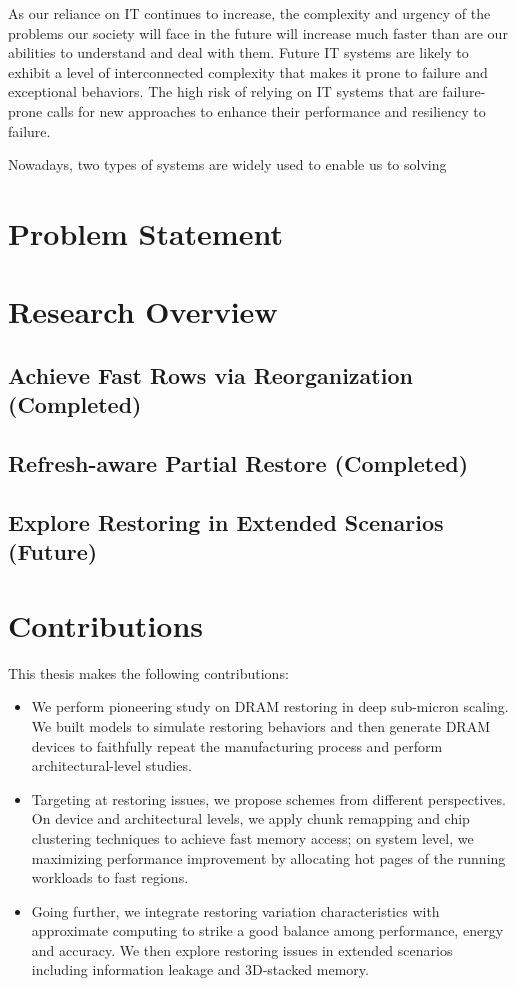 As our reliance on IT continues to increase, the complexity and urgency of the problems our society will face in the future will increase much faster than are our abilities to understand and deal with them. Future IT systems are likely to exhibit a level of interconnected complexity that makes it prone to failure and exceptional behaviors. The high risk of relying on IT systems that are failure-prone calls for new approaches to enhance their performance and resiliency to failure. 

Nowadays, two types of systems are widely used to enable us to solving 



\section{Problem Statement}

\section{Research Overview}

\subsection{Achieve Fast Rows via Reorganization (Completed)}

\subsection{Refresh-aware Partial Restore (Completed)}

\subsection{Explore Restoring in Extended Scenarios (Future)}


\section{Contributions}
This thesis makes the following contributions:

\begin{itemize}
\item We perform pioneering study on DRAM restoring in deep sub-micron scaling. We built models to simulate restoring behaviors and then generate DRAM devices to faithfully repeat the manufacturing process  and perform architectural-level studies.
\item Targeting at restoring issues, we propose schemes from different perspectives. On device and architectural levels, we apply chunk remapping and chip clustering techniques to achieve fast memory access; on system level, we maximizing performance improvement by allocating hot pages of the running workloads to fast regions.
\item Going further, we integrate restoring variation characteristics with approximate computing to strike a good balance among performance, energy and accuracy. We then explore restoring issues in extended scenarios including information leakage and 3D-stacked memory.  
\end{itemize}


